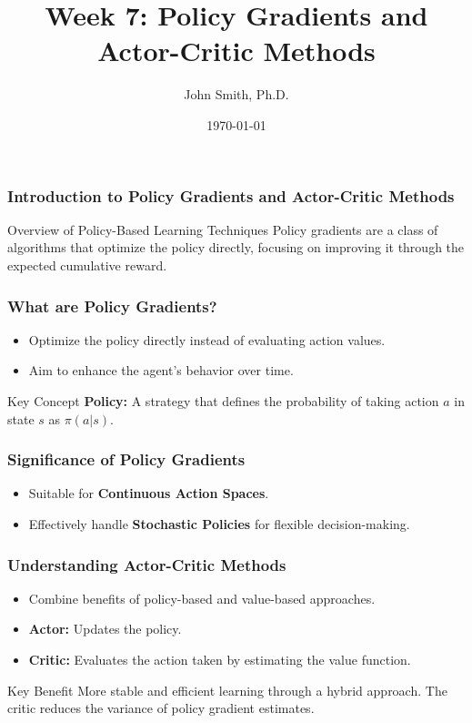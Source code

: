 \documentclass[aspectratio=169]{beamer}
\begin{document}
\frame{\titlepage}

\begin{frame}[fragile]
    \title{Week 7: Policy Gradients and Actor-Critic Methods}
    \author{John Smith, Ph.D.}
    \date{\today}
    \titlepage
\end{frame}

\begin{frame}[fragile]
    \frametitle{Introduction to Policy Gradients and Actor-Critic Methods}
    \begin{block}{Overview of Policy-Based Learning Techniques}
        Policy gradients are a class of algorithms that optimize the policy directly, focusing on improving it through the expected cumulative reward.
    \end{block}
\end{frame}

\begin{frame}[fragile]
    \frametitle{What are Policy Gradients?}
    \begin{itemize}
        \item Optimize the policy directly instead of evaluating action values.
        \item Aim to enhance the agent's behavior over time.
    \end{itemize}
    
    \begin{block}{Key Concept}
        \textbf{Policy:} A strategy that defines the probability of taking action \(a\) in state \(s\) as \( \pi(a|s) \).
    \end{block}
\end{frame}

\begin{frame}[fragile]
    \frametitle{Significance of Policy Gradients}
    \begin{itemize}
        \item Suitable for \textbf{Continuous Action Spaces}.
        \item Effectively handle \textbf{Stochastic Policies} for flexible decision-making.
    \end{itemize}
\end{frame}

\begin{frame}[fragile]
    \frametitle{Understanding Actor-Critic Methods}
    \begin{itemize}
        \item Combine benefits of policy-based and value-based approaches.
        \item \textbf{Actor:} Updates the policy.
        \item \textbf{Critic:} Evaluates the action taken by estimating the value function.
    \end{itemize}
    
    \begin{block}{Key Benefit}
        More stable and efficient learning through a hybrid approach. The critic reduces the variance of policy gradient estimates.
    \end{block}
\end{frame}
\end{document}
